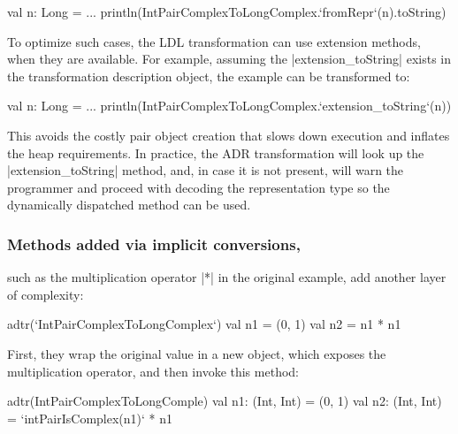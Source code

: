 \begin{lstlisting-nobreak}
val n: Long = ...
println(IntPairComplexToLongComplex.`fromRepr`(n).toString)
\end{lstlisting-nobreak}

To optimize such cases, the LDL transformation can use extension
methods, when they are
available. For example, assuming the |extension_toString| exists in
the transformation description object, the example can be transformed
to:

\begin{lstlisting-nobreak}
val n: Long = ...
println(IntPairComplexToLongComplex.`extension_toString`(n))
\end{lstlisting-nobreak}

This avoids the costly pair object creation that slows down execution and inflates the heap requirements. In practice, the ADR transformation will look up the |extension_toString| method, and, in case it is not present, will warn the programmer and proceed with decoding the representation type so the dynamically dispatched method can be used.

\subsubsection{Methods added via implicit conversions,} such as the multiplication operator |*| in the original example, add another layer of complexity:

\begin{lstlisting-nobreak}
adtr(`IntPairComplexToLongComplex`) {
  val n1 = (0, 1)
  val n2 = n1 * n1
}
\end{lstlisting-nobreak}

First, they wrap the original value in a new object, which exposes the multiplication operator, and then invoke this method:

\begin{lstlisting-nobreak}
adtr(IntPairComplexToLongComple) {
  val n1: (Int, Int) = (0, 1)
  val n2: (Int, Int) = `intPairIsComplex(n1)` * n1
}
\end{lstlisting-nobreak}

